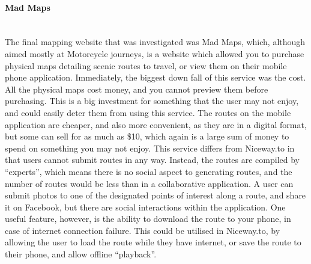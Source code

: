 \newpage 
\paragraph{Mad Maps}\ \\
The final mapping website that was investigated was Mad Maps, which, although aimed mostly at Motorcycle journeys, is a website which allowed you to purchase physical maps detailing scenic routes to travel, or view them on their mobile phone application. Immediately, the biggest down fall of this service was the cost. All the physical maps cost money, and you cannot preview them before purchasing. This is a big investment for something that the user may not enjoy, and could easily deter them from using this service. The routes on the mobile application are cheaper, and also more convenient, as they are in a digital format, but some can sell for as much as \$10, which again is a large sum of money to spend on something you may not enjoy. This service differs from Niceway.to in that users cannot submit routes in any way. Instead, the routes are compiled by ``experts'', which means there is no social aspect to generating routes, and the number of routes would be less than in a collaborative application. A user can submit photos to one of the designated points of interest along a route, and share it on Facebook, but there are social interactions within the application. One useful feature, however, is the ability to download the route to your phone, in case of internet connection failure. This could be utilised in Niceway.to, by allowing the user to load the route while they have internet, or save the route to their phone, and allow offline ``playback''. 


